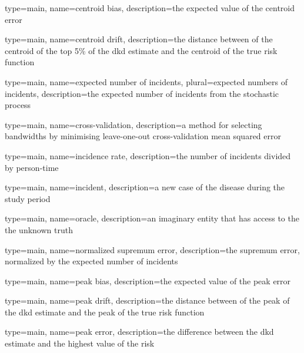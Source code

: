 

{%
   type=main,
   name={centroid bias},
   description={the expected value of the centroid error}
}

{%
   type=main,
   name={centroid drift},
   description={the distance between of the centroid of the top 5\% of the dkd estimate and the centroid of the true risk function}
}

{%
   type=main,
   name={expected number of incidents},
   plural={expected numbers of incidents},
   description={the expected number of incidents from the stochastic process}
}

{%
   type=main,
   name={cross-validation},
   description={a method for selecting bandwidths by minimising leave-one-out cross-validation mean squared error}
}

{
   type=main,
   name={incidence rate},
   description={the number of incidents divided by person-time}
}

{
   type=main,
   name={incident},
   description={a new case of the disease during the study period}
}

{
   type=main,
   name={oracle},
   description={an imaginary entity that has access to the the unknown truth}
}

{%
   type=main,
   name={normalized supremum error},
   description={the supremum error, normalized by the expected number of incidents}
}

{%
   type=main,
   name={peak bias},
   description={the expected value of the peak error}
}

{%
   type=main,
   name={peak drift},
   description={the distance between of the peak of the dkd estimate and the peak of the true risk function}
}

{%
   type=main,
   name={peak error},
   description={the difference between the dkd estimate and the highest value of the risk}
}

